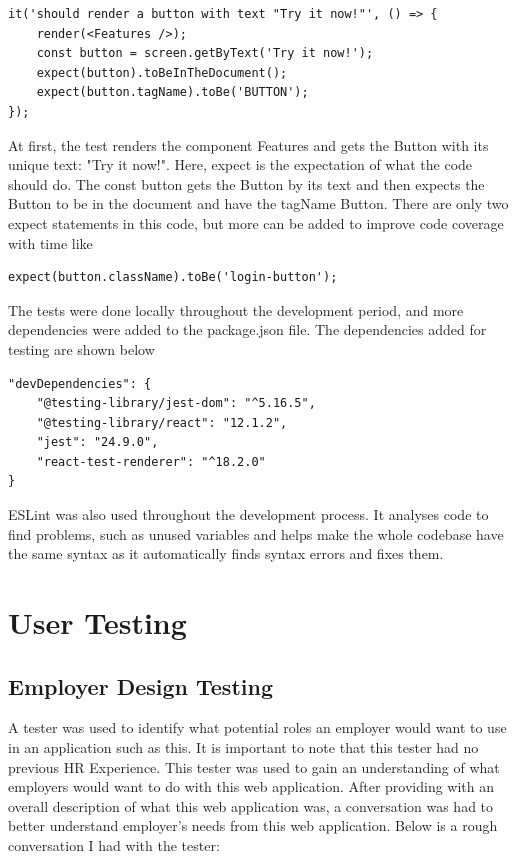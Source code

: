 \begin{lstlisting}
it('should render a button with text "Try it now!"', () => {
    render(<Features />);
    const button = screen.getByText('Try it now!');
    expect(button).toBeInTheDocument();
    expect(button.tagName).toBe('BUTTON');
});
\end{lstlisting}
At first, the test renders the component Features and gets the Button with its unique text: "Try it now!". Here, expect is the expectation of what the code should do. The const button gets the Button by its text and then expects the Button to be in the document and have the tagName Button. There are only two expect statements in this code, but more can be added to improve code coverage with time like 
\begin{lstlisting}
expect(button.className).toBe('login-button');
\end{lstlisting}

The tests were done locally throughout the development period, and more dependencies were added to the package.json file. The dependencies added for testing are shown below
\begin{lstlisting}
"devDependencies": {
    "@testing-library/jest-dom": "^5.16.5",
    "@testing-library/react": "12.1.2",
    "jest": "24.9.0",
    "react-test-renderer": "^18.2.0"
}
\end{lstlisting} 

ESLint was also used throughout the development process. It analyses code to find problems, such as unused variables and helps make the whole codebase have the same syntax as it automatically finds syntax errors and fixes them. 

\section{User Testing}
\subsection{Employer Design Testing}
A tester was used to identify what potential roles an employer would want to use in an application such as this. It is important to note that this tester had no previous HR Experience. This tester was used to gain an understanding of what employers would want to do with this web application. After providing with an overall description of what this web application was, a conversation was had to better understand employer's needs from this web application. Below is a rough conversation I had with the tester:

